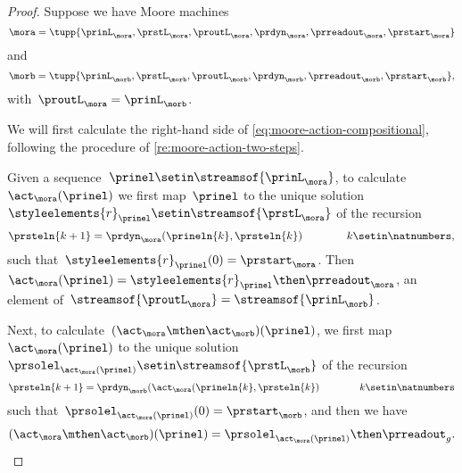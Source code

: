 \begin{proof}
    Suppose we have Moore machines
    \begin{equation}
        \mora = \tupp{\prinL_{\mora},\prstL_{\mora},\proutL_{\mora},\prdyn_{\mora},\prreadout_{\mora},\prstart_{\mora}}
    \end{equation}
    and
    \begin{equation}
        \morb = \tupp{\prinL_{\morb},\prstL_{\morb},\proutL_{\morb},\prdyn_{\morb},\prreadout_{\morb},\prstart_{\morb}},
    \end{equation}
    with~$\proutL_\mora = \prinL_\morb$.

    We will first calculate the right-hand side of \cref{eq:moore-action-compositional}, following the procedure of \cref{re:moore-action-two-steps}.

    Given a sequence~$\prinel \setin \streamsof{\prinL_{\mora}}$, to calculate~$\act_\mora(\prinel)$ we first map~$\prinel$ to the unique solution~$\styleelements{r}_\prinel \setin \streamsof{\prstL_{\mora}}$ of the recursion
    \begin{equation}
        \prsteln{k+1} = \prdyn_\mora(\prineln{k}, \prsteln{k})  \qquad \qquad k \setin \natnumbers,
    \end{equation}
    such that~$\styleelements{r}_\prinel(0) = \prstart_{\mora}$.
    Then~$\act_\mora(\prinel) = \styleelements{r}_\prinel \then \prreadout_\mora$, an element of~$\streamsof{\proutL_{\mora}} = \streamsof{\prinL_{\morb}}$.

    Next, to calculate~$(\act_\mora \mthen \act_\morb)(\prinel)$, we first map~$\act_\mora(\prinel)$ to the unique solution~$\prsolel_{\act_\mora(\prinel)} \setin \streamsof{\prstL_{\morb}}$ of the recursion
        \begin{equation}
            \prsteln{k+1} = \prdyn_\morb(\act_\mora(\prineln{k}, \prsteln{k})  \qquad \qquad k \setin \natnumbers
        \end{equation}
        such that~$\prsolel_{\act_\mora(\prinel)}(0) = \prstart_{\morb}$, and then we have
        \begin{equation}
            \label{eq:Moore-act-composition-1}
            (\act_\mora \mthen \act_\morb)(\prinel) = \prsolel_{\act_\mora(\prinel)} \then \prreadout_g.
        \end{equation}


\end{proof}
